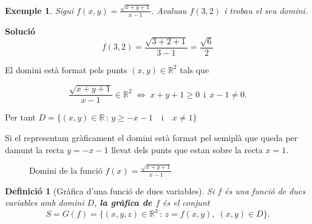 \documentclass[12pt]{article}
\newcommand{\solucio}{\textbf{Soluci{\'o}}\ \ }
\newtheorem{definicio}{Definici{\'o}}[subsection]
\newtheorem{exemple}{Exemple}[subsection]
\newcommand{\R}{\mathbb{R}}
\begin{document}
\vspace{0.7cm}
\begin{exemple}
Sigui $f(x,y)=\frac{\sqrt{x+y+1}}{x-1}$. Avaluau $f(3,2)$ i trobau
el seu domini.
\end{exemple}

\solucio
\[
f(3,2)=\frac{\sqrt{3+2+1}}{3-1} = \frac{\sqrt{6}}{2}
\]

El domini est{\`a} format pels punts $(x,y)\in \R^2$ tals que

\[
\frac{\sqrt{x+y+1}}{x-1}\in\R^2 \; \Longleftrightarrow \;
x+y+1\geq 0\,\; \mbox{i}\,\; x-1\not= 0.
\]

\vspace{0.4cm}
Per tant $D=\{(x,y)\in\R\, :\, y\geq -x-1  \quad \mbox{i}\quad
x\not= 1\}$

Si el representam gr{\`a}ficament el domini est{\`a} format pel
semipl{\`a} que queda per damunt la recta $y=-x-1$ llevat dels punts
que estan sobre la recta $x=1$.
\begin{figure}[h!]
\begin{center}
\vspace{-.4cm}
\end{center}
\caption{Domini de la funci{\'o} $f(x)=\frac{\sqrt{x+y+1}}{x-1}$}
\end{figure}

%
%
%

\vspace{0.4cm}
\begin{definicio}[Gr{\`a}fica d'una funci{\'o} de dues variables]
Si $f$ {\'e}s una funci{\'o} de dues variables amb domini $D$, \textbf{la
gr{\`a}fica de $f$} {\'e}s el conjunt
\[
S=G(f)=\{(x,y,z)\in \R^3\, :\, z=f(x,y),\; (x,y)\in D  \}.
\]
\end{definicio}
\end{document}
